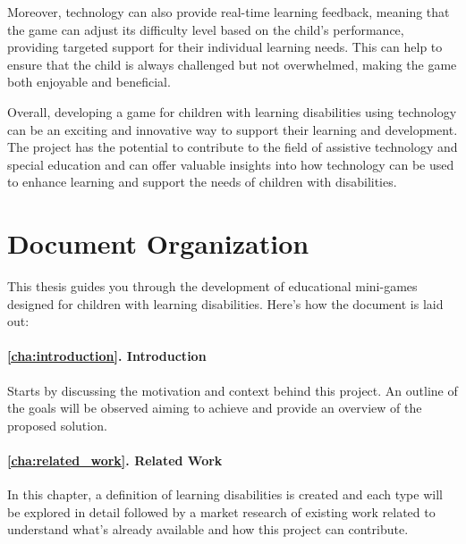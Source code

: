 Moreover, technology can also provide real-time learning feedback, meaning that the game can adjust its difficulty level based on the child's performance, providing targeted support for their individual learning needs. This can help to ensure that the child is always challenged but not overwhelmed, making the game both enjoyable and beneficial.

Overall, developing a game for children with learning disabilities using technology can be an exciting and innovative way to support their learning and development. The project has the potential to contribute to the field of assistive technology and special education and can offer valuable insights into how technology can be used to enhance learning and support the needs of children with disabilities.


\section{Document Organization}

This thesis guides you through the development of educational mini-games designed for children with learning disabilities. Here’s how the document is laid out:

\paragraph{\ref{cha:introduction}. Introduction} Starts by discussing the motivation and context behind this project. An outline of the goals will be observed aiming to achieve and provide an overview of the proposed solution.

\paragraph{\ref{cha:related_work}. Related Work} In this chapter, a definition of learning disabilities is created and each type will be explored in detail followed by a market research of existing work related to understand what’s already available and how this project can contribute.

